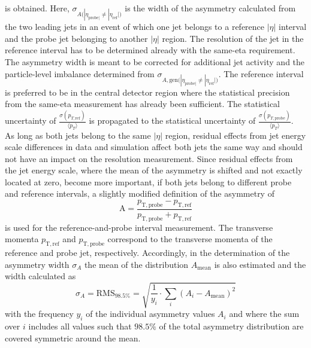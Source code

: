 is obtained. Here, $\sigma_{A({|\eta_{\mathrm{probe}|} \neq |\eta_{\mathrm{ref}}|)}}$ is the width of the asymmetry calculated from the two leading jets in an event of which one jet belongs to a reference $|\eta|$ interval and the probe jet belonging to another $|\eta|$ region. The resolution of the jet in the reference interval has to be determined already with the same-eta requirement. The asymmetry width is meant to be corrected for additional jet activity and the particle-level imbalance determined from $\sigma_{A, \mathrm{gen} ({|\eta_{\mathrm{probe}|} \neq |\eta_{\mathrm{ref}}|)}}$. The reference interval is preferred to be in the central detector region where the statistical precision from the same-eta measurement has already been sufficient. The statistical uncertainty of $\frac{\sigma (p_{T, \mathrm{ref}})}{{\langle p_{T} \rangle}}$ is propagated to the statistical uncertainty of $\frac{\sigma (p_{T, \mathrm{probe}})}{\langle p_{T} \rangle}$. \\
As long as both jets belong to the same $|\eta|$ region, residual effects from jet energy scale differences in data and simulation affect both jets the same way and should not have an impact on the resolution measurement. Since residual effects from the jet energy scale, where the mean of the asymmetry is shifted and not exactly located at zero, become more important, if both jets belong to different probe and reference intervals, a slightly modified definition of the asymmetry of
\begin{equation}
\label{eq:forwardasymmdef}
  \mathrm{A} = \frac{p_{\mathrm{T,probe}} - p_{\mathrm{T,ref}}}{p_{\mathrm{T,probe}} + p_{\mathrm{T,ref}}} 
 \end{equation}
is used for the reference-and-probe interval measurement. The transverse momenta $p_{\mathrm{T,ref}}$ and $p_{\mathrm{T,probe}}$ correspond to the transverse momenta of the reference and probe jet, respectively. Accordingly, in the determination of the asymmetry width $\sigma_{A}$ the mean of the distribution $A_\mathrm{mean}$ is also estimated and the width calculated as
\begin{equation}
\label{eq:forwardasymmwidthdef}
  \sigma_{A} = \mathrm{RMS}_{98.5\%} = \sqrt{\frac{1}{y_i} \cdot \sum_{i}(A_i-A_\mathrm{mean})^2} 
 \end{equation}
with the frequency $y_i$ of the individual asymmetry values $A_i$ and where the sum over $i$ includes all values such that $98.5\%$ of the total asymmetry distribution are covered symmetric around the mean.\\
